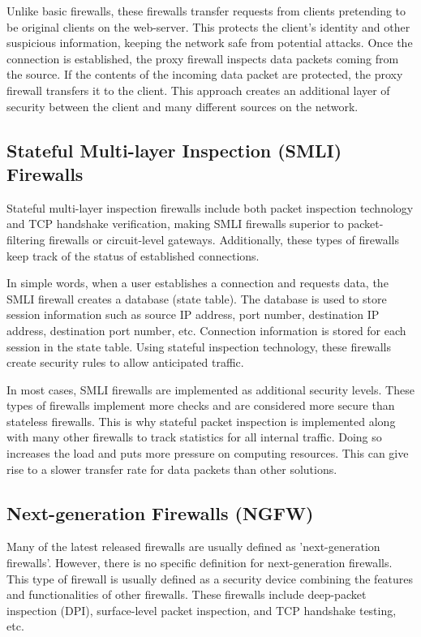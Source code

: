 \documentclass[a4paper,12pt]{book}
\begin{document}
Unlike basic firewalls, these firewalls transfer requests from clients pretending to be original clients on the web-server. This protects the client's identity and other suspicious information, keeping the network safe from potential attacks. Once the connection is established, the proxy firewall inspects data packets coming from the source. If the contents of the incoming data packet are protected, the proxy firewall transfers it to the client. This approach creates an additional layer of security between the client and many different sources on the network.
\subsection{Stateful Multi-layer Inspection (SMLI) Firewalls}
Stateful multi-layer inspection firewalls include both packet inspection technology and TCP handshake verification, making SMLI firewalls superior to packet-filtering firewalls or circuit-level gateways. Additionally, these types of firewalls keep track of the status of established connections.

In simple words, when a user establishes a connection and requests data, the SMLI firewall creates a database (state table). The database is used to store session information such as source IP address, port number, destination IP address, destination port number, etc. Connection information is stored for each session in the state table. Using stateful inspection technology, these firewalls create security rules to allow anticipated traffic.

In most cases, SMLI firewalls are implemented as additional security levels. These types of firewalls implement more checks and are considered more secure than stateless firewalls. This is why stateful packet inspection is implemented along with many other firewalls to track statistics for all internal traffic. Doing so increases the load and puts more pressure on computing resources. This can give rise to a slower transfer rate for data packets than other solutions.
\subsection{Next-generation Firewalls (NGFW)}
Many of the latest released firewalls are usually defined as 'next-generation firewalls'. However, there is no specific definition for next-generation firewalls. This type of firewall is usually defined as a security device combining the features and functionalities of other firewalls. These firewalls include deep-packet inspection (DPI), surface-level packet inspection, and TCP handshake testing, etc.
\end{document}
